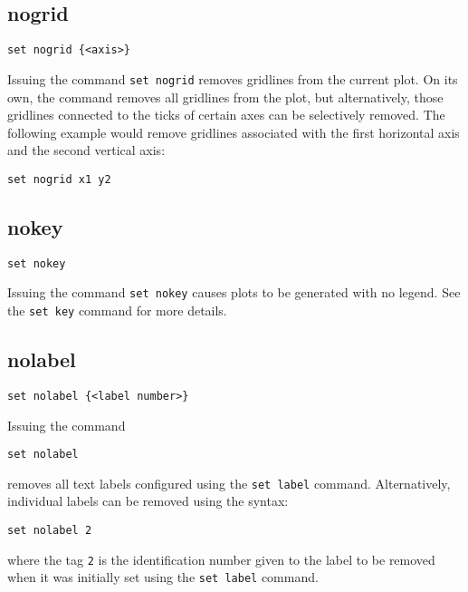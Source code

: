 \subsection{nogrid}

\begin{verbatim}
set nogrid {<axis>}
\end{verbatim}

Issuing the command {\tt set nogrid} removes gridlines from the current plot. On
its own, the command removes all gridlines from the plot, but alternatively,
those gridlines connected to the ticks of certain axes can be selectively
removed.  The following example would remove gridlines associated with the
first horizontal axis and the second vertical axis:

\begin{verbatim}
set nogrid x1 y2
\end{verbatim}


\subsection{nokey}

\begin{verbatim}
set nokey
\end{verbatim}

Issuing the command {\tt set nokey} causes plots to be generated with no legend.
See the {\tt set key} command for more details.


\subsection{nolabel}

\begin{verbatim}
set nolabel {<label number>}
\end{verbatim}

Issuing the command

\begin{verbatim}
set nolabel
\end{verbatim}

\noindent removes all text labels configured using the {\tt set label} command.
Alternatively, individual labels can be removed using the syntax:

\begin{verbatim}
set nolabel 2
\end{verbatim}

\noindent where the tag {\tt 2} is the identification number given to the label
to be removed when it was initially set using the {\tt set label} command.


